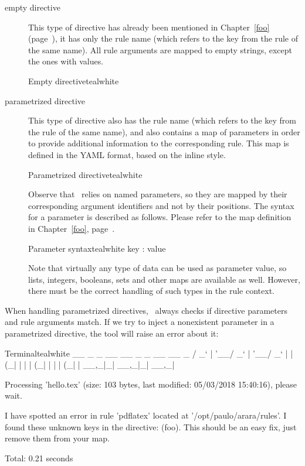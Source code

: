 \begin{description}
\item[empty directive] This type of directive has already been mentioned in Chapter~\ref{foo} (page~\pageref{foo}), it has only the rule name (which refers to the  key from the rule of the same name). All rule arguments are mapped to empty strings, except the ones with  values.

\begin{codebox}{Empty directive}{teal}{\icnote}{white}
\end{codebox}

\item[parametrized directive] This type of directive also has the rule name (which refers to the  key from the rule of the same name), and also contains a map of parameters in order to provide additional information to the corresponding rule. This map is defined in the YAML format, based on the inline style.

\begin{codebox}{Parametrized directive}{teal}{\icnote}{white}
\end{codebox}

Observe that \arara\ relies on named parameters, so they are mapped by their corresponding argument identifiers and not by their positions. The syntax for a parameter is described as follows. Please refer to the map definition in Chapter~\ref{foo}, page~\pageref{foo}.

\begin{codebox}{Parameter syntax}{teal}{\icnote}{white}
key : value
\end{codebox}

Note that virtually any type of data can be used as parameter value, so lists, integers, booleans, sets and other maps are available as well. However, there must be the correct handling of such types in the rule context.
\end{description}

When handling parametrized directives, \arara\ always checks if directive parameters and rule arguments match. If we try to inject a nonexistent parameter in a parametrized directive, the tool will raise an error about it:

\begin{codebox}{Terminal}{teal}{\icnote}{white}
  __ _ _ __ __ _ _ __ __ _ 
 / _` | '__/ _` | '__/ _` |
| (_| | | | (_| | | | (_| |
 \__,_|_|  \__,_|_|  \__,_|

Processing 'hello.tex' (size: 103 bytes, last modified:
05/03/2018 15:40:16), please wait.

I have spotted an error in rule 'pdflatex' located at
'/opt/paulo/arara/rules'. I found these unknown keys
in the directive: (foo). This should be an easy fix,
just remove them from your map.

Total: 0.21 seconds
\end{codebox}

